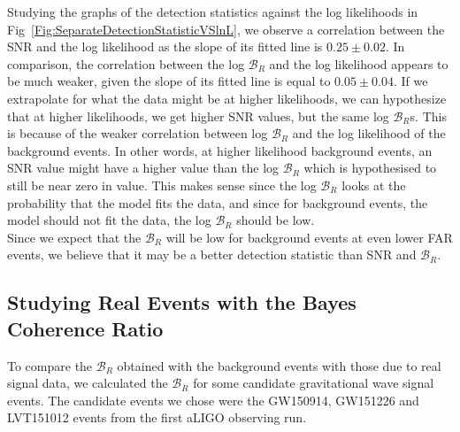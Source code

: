 \documentclass{article}
\begin{document}
                
                
     Studying the graphs of the detection statistics against the log likelihoods in Fig~\ref{Fig:SeparateDetectionStatisticVSlnL}, we observe a correlation between the SNR and the log likelihood as the slope of its fitted line is $0.25\pm0.02$. In comparison, the correlation between the log $\mathcal{B}_{R}$ and the log likelihood appears to be much weaker, given the slope of its fitted line is equal to $0.05\pm0.04$. If we extrapolate for what the data might be at higher likelihoods, we can hypothesize that at higher likelihoods, we get higher SNR values, but the same log $\mathcal{B}_{R}$s. This is because of the weaker correlation between log $\mathcal{B}_{R}$ and the log likelihood of the background events. In other words, at higher likelihood background events, an SNR value might have a higher value than the log $\mathcal{B}_{R}$ which is hypothesised to still be near zero in value. This makes sense since the log $\mathcal{B}_{R}$ looks at the probability that the model fits the data, and since for background events, the model should not fit the data, the log $\mathcal{B}_{R}$ should be low.\\
     
       Since we expect that the $\mathcal{B}_{R}$ will be low for background events at even lower FAR events, we believe that it may be a better detection statistic than SNR and $\mathcal{B}_{R}$.\\ 
     
    
     
     
  
 
 
 \subsection{Studying Real Events with the Bayes Coherence Ratio}
 
 
 
 To compare the $\mathcal{B}_{R}$ obtained with the background events with those due to real signal data, we calculated the $\mathcal{B}_{R}$ for some candidate gravitational wave signal events. The candidate events we chose were the GW150914, GW151226 and LVT151012 events from the first aLIGO observing run.
 
 
\end{document}
